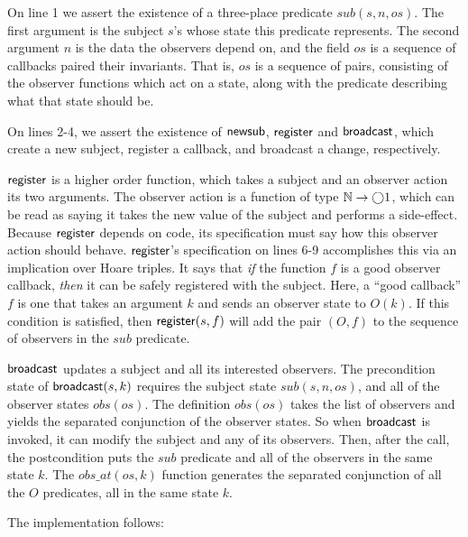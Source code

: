 %
On line 1 we assert the existence of a three-place predicate $sub(s,
n, os)$. The first argument is the subject $s$'s whose state this
predicate represents. The second argument $n$ is the data the
observers depend on, and the field $os$ is a sequence of callbacks
paired their invariants. That is, $os$ is a sequence of pairs,
consisting of the observer functions which act on a state, along with
the predicate describing what that state should be.

On lines 2-4, we assert the existence of $\mathsf{newsub}$,
$\mathsf{register}$ and $\mathsf{broadcast}$, which create a new
subject, register a callback, and broadcast a change, respectively.

$\mathsf{register}$ is a higher order function, which takes a subject
and an observer action its two arguments. The observer action is a
function of type $\mathbb{N} \to \bigcirc{1}$, which can be read as saying it
takes the new value of the subject and performs a side-effect. Because
$\mathsf{register}$ depends on code, its specification must say how
this observer action should behave. $\mathsf{register}$'s specification
on lines 6-9 accomplishes this via an implication over Hoare
triples. It says that \emph{if} the function $f$ is a good observer
callback, \emph{then} it can be safely registered with the
subject. Here, a ``good callback'' $f$ is one that takes an argument
$k$ and sends an observer state to $O(k)$. If this condition is
satisfied, then $\mathsf{register}(s, f)$ will add the pair $(O,f)$ to
the sequence of observers in the $sub$ predicate.

$\mathsf{broadcast}$ updates a subject and all its interested
observers.  The precondition state of $\mathsf{broadcast}(s,k)$
requires the subject state $sub(s,n,os)$, and all of the observer
states $obs(os)$. The definition $obs(os)$ takes the list of observers
and yields the separated conjunction of the observer states. So when
$\mathsf{broadcast}$ is invoked, it can modify the subject and any of
its observers. Then, after the call, the postcondition puts the $sub$
predicate and all of the observers in the same state $k$. The
$obs\_at(os,k)$ function generates the separated conjunction of all
the $O$ predicates, all in the same state $k$.

The implementation follows:

